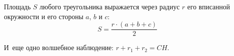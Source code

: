 \statement
Площадь $S$ любого треугольника выражается через радиус $r$ его вписанной
окружности и его стороны $a$, $b$ и $c$:
\[
    S = \frac{r \cdot (a + b + c)}{2}
\]

\begin{problems}

\item
И~еще одно волшебное наблюдение: $r + r_1 + r_2 = CH$.

\end{problems}

